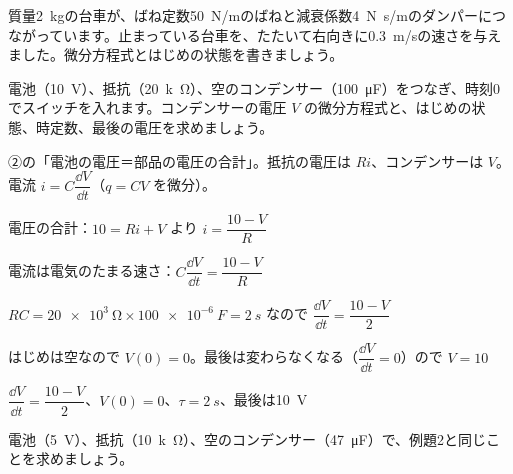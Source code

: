 \begin{jibun}
質量\qty{2}{kg}の台車が、ばね定数\qty{50}{N/m}のばねと減衰係数\qty{4}{N.s/m}のダンパーにつながっています。止まっている台車を、たたいて右向きに\qty{0.3}{m/s}の速さを与えました。微分方程式とはじめの状態を書きましょう。
\end{jibun}

\begin{reidai}[法則から式を立てる：RC 回路]
電池（\qty{10}{V}）、抵抗（\qty{20}{k\ohm}）、空のコンデンサー（\qty{100}{\micro F}）をつなぎ、時刻0でスイッチを入れます。コンデンサーの電圧 $V$ の微分方程式と、はじめの状態、時定数、最後の電圧を求めましょう。\par
\kangaekata ②の「電池の電圧＝部品の電圧の合計」。抵抗の電圧は $Ri$、コンデンサーは $V$。電流 $i=C\dfrac{\dd V}{\dd t}$（$q=CV$ を微分）。\par
\shiki\kvips{}\zw{} 電圧の合計：$10=Ri+V$ より $i=\dfrac{10-V}{R}$\par
\kvipa 電流は電気のたまる速さ：$C\dfrac{\dd V}{\dd t}=\dfrac{10-V}{R}$\par
\kvipa $RC=\qty{20e3}{\ohm}\times\qty{100e-6}{F}=\qty{2}{s}$ なので $\dfrac{\dd V}{\dd t}=\dfrac{10-V}{2}$\par
\kvipa はじめは空なので $V(0)=0$。最後は変わらなくなる（$\dfrac{\dd V}{\dd t}=0$）ので $V=10$\par
\kotae\kvips{}\zw{} $\dfrac{\dd V}{\dd t}=\dfrac{10-V}{2}$、$V(0)=0$、$\tau=\qty{2}{s}$、最後は\qty{10}{V}
\end{reidai}

\begin{jibun}
電池（\qty{5}{V}）、抵抗（\qty{10}{k\ohm}）、空のコンデンサー（\qty{47}{\micro F}）で、例題2と同じことを求めましょう。
\end{jibun}

